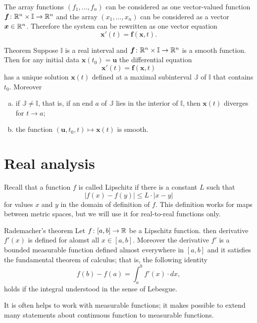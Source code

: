 The array functions $(f_1,\dots,f_n)$ can be considered as one vector-valued function 
$\bm{f}\colon\mathbb{R}^n\times \mathbb{I}\to \mathbb{R}^n$ and the array $(x_1,\dots,x_n)$ can be considered as a vector  $\bm{x}\in\mathbb{R}^n$.
Therefore the system can be rewritten as one vector equation 
\[\bm{x}'(t)=\bm{f}(\bm{x}, t).\] 

\begin{thm}{Theorem}\label{thm:ODE}
Suppose $\mathbb{I}$ is a real interval and $\bm{f}\colon\mathbb{R}^n\times\mathbb{I}\to \mathbb{R}^n$ is a smooth function.
Then for any initial data $\bm{x}(t_0)=\bm{u}$ the differential equation 
\[\bm{x}'(t)=\bm{f}(\bm{x},t)\]
has a unique solution $\bm{x}(t)$ defined at a maximal subinterval $\mathbb{J}$ of $\mathbb{I}$ that contains $t_0$.
Moreover
\begin{enumerate}[(a)]
\item  if $\mathbb{J}\ne \mathbb{I}$, that is, if an end $a$ of $\mathbb{J}$ lies in the interior of $\mathbb{I}$, then $\bm{x}(t)$ diverges for $t\to a$;
\item  the function $(\bm{u},t_0,t)\mapsto \bm{x}(t)$ is smooth.
\end{enumerate}


\end{thm}

\section{Real analysis}


Recall that a function $f$ is called Lipschitz if there is a constant $L$ such that 
\[|f(x)-f(y)|\le L\cdot|x-y|\]
for values $x$ and $y$ in the domain of definition of $f$.
This definition works for maps between metric spaces, but we will use it for real-to-real functions only.

\begin{thm}{Rademacher's theorem}\label{thm:rademacher}
Let $f\colon[a,b]\to\mathbb{R}$ be a Lipschitz function.
then derivative $f'(x)$ is defined for alomst all $x\in [a,b]$.
Moreover the derivative $f'$ is a bounded measurable function defined almost everywhere in $[a,b]$ and it satisfies the fundamental theorem of calculus; that is, the following identity 
\[f(b)-f(a)=\int_a^b f'(x)\cdot dx,\]
holds if the integral understood in the sense of Lebesgue.
\end{thm}

It is often helps to work with measurable functions; 
it makes possible to extend many statements about continuous function to measurable functions.

